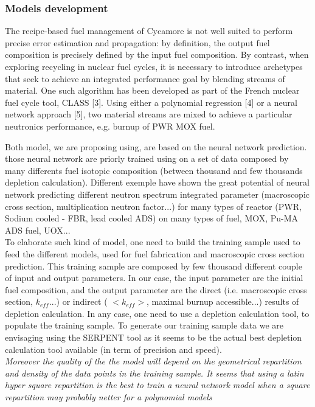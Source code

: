 \documentclass[dvips,12pt]{article}
\begin{document}
\subsubsection{Models development}
The recipe-based fuel management of Cycamore is not well suited to perform precise error estimation and propagation: by definition, the output fuel composition is precisely defined by the input fuel composition.   By contrast, when exploring recycling in nuclear fuel cycles, it is necessary to introduce archetypes that seek to achieve an integrated performance goal by blending streams of material.  One such algorithm has been developed as part of the French nuclear fuel cycle tool, CLASS [3].  Using either a polynomial regression [4] or a neural network approach [5], two material streams are mixed to achieve a particular neutronics performance, e.g. burnup of PWR MOX fuel.
	
	
Both model, we are proposing using, are based on the neural network prediction. those neural network are priorly trained using on a set of data composed by many differents fuel isotopic composition (between thousand and few thousands depletion calculation).
Different exemple have shown the great potential of neural network predicting different neutron spectrum integrated parameter (macroscopic cross section, multiplication neutron factor...) for many types of reactor (PWR, Sodium cooled - FBR,  lead cooled ADS) on many types of fuel, MOX, Pu-MA ADS fuel, UOX...\\

 
To elaborate such kind of model, one need to build the training sample used to feed the different models, used for fuel fabrication and macroscopic cross section prediction.
This training sample are composed by few thousand different couple of input and output parameters. In our case, the input parameter are the initial fuel composition, and the output parameter are the direct (i.e. macroscopic cross section, $k_{eff}$...) or indirect ( $<k_{eff}>$, maximal burnup accessible...) results of depletion calculation. 
In any case, one need to use a depletion calculation tool, to populate the training sample. 
To generate our training sample data we are envisaging using the SERPENT tool as it seems to be the actual best depletion calculation tool available (in term of precision and speed).%
\\
\textit{Moreover the quality of the the model will depend on the geometrical repartition and density of the data points in the training sample.
It seems that using a latin hyper square repartition \cite{} is the best to train a neural network model when a square repartition may probably netter for a polynomial models } %
\end{document}
